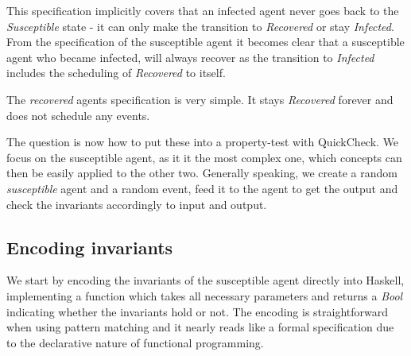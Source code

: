 This specification implicitly covers that an infected agent never goes back to the \textit{Susceptible} state - it can only make the transition to \textit{Recovered} or stay \textit{Infected}. From the specification of the susceptible agent it becomes clear that a susceptible agent who became infected, will always recover as the transition to \textit{Infected} includes the scheduling of \textit{Recovered} to itself. 

\medskip

The \textit{recovered} agents specification is very simple. It stays \textit{Recovered} forever and does not schedule any events.

\medskip

The question is now how to put these into a property-test with QuickCheck. We focus on the susceptible agent, as it it the most complex one, which concepts can then be easily applied to the other two. Generally speaking, we create a random \textit{susceptible} agent and a random event, feed it to the agent to get the output and check the invariants accordingly to input and output. %

\subsection{Encoding invariants}
We start by encoding the invariants of the susceptible agent directly into Haskell, implementing a function which takes all necessary parameters and returns a \textit{Bool} indicating whether the invariants hold or not. The encoding is straightforward when using pattern matching and it nearly reads like a formal specification due to the declarative nature of functional programming.


